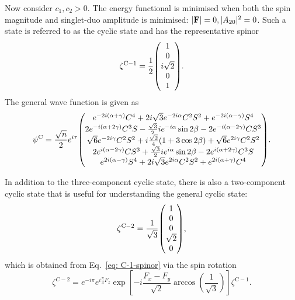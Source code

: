 Now consider \(c_1, c_2 > 0\).
The energy functional is minimised when both the spin magnitude and singlet-duo
amplitude is minimised: \(|\vb{F}| = 0, |A_{20}|^2=0\).
Such a state is referred to as the cyclic state and has the representative
spinor
\begin{equation}
    \zeta^\mathrm{C-1} = \frac{1}{2}\mqty(1 \\ 0 \\ i\sqrt{2} \\ 0 \\ 1).
    \label{eq: C-1-spinor}
\end{equation}
The general wave function is given as
\begin{equation}
    \psi^\mathrm{C} = \frac{\sqrt{n}}{2}e^{i\tau} \mqty(
    e^{-2i(\alpha+\gamma)}C^4 + 2i\sqrt{3}e^{-2i\alpha}C^2S^2
    + e^{-2i(\alpha-\gamma)}S^4
    \\
    2e^{-i(\alpha+2\gamma)}C^3S - \frac{\sqrt{3}}{2}ie^{-i\alpha}\sin 2\beta
    - 2e^{-i(\alpha-2\gamma)}CS^3
    \\
    \sqrt{6}e^{-2i\gamma}C^2S^2 + i\frac{\sqrt{2}}{4}(1+3\cos 2\beta)
    + \sqrt{6}e^{2i\gamma}C^2S^2
    \\
    2e^{i(\alpha-2\gamma)}CS^3 + \frac{\sqrt{3}}{2}ie^{i\alpha}\sin 2\beta
    - 2e^{i(\alpha+2\gamma)}C^3S
    \\
    e^{2i(\alpha-\gamma)}S^4 + 2i\sqrt{3}e^{2i\alpha}C^2S^2
    + e^{2i(\alpha+\gamma)}C^4
    ).
\end{equation}

In addition to the three-component cyclic state, there is also a two-component
cyclic state that is useful for understanding the general cyclic state:
\begin{equation}
    \zeta^\mathrm{C-2} = \frac{1}{\sqrt{3}}\mqty(1  \\ 0 \\ 0 \\ \sqrt{2} \\ 0),
    \label{eq: C-2-spinor}
\end{equation}
which is obtained from Eq.~\eqref{eq: C-1-spinor} via the spin rotation
\begin{equation}
    \zeta^{C-2} = e^{-i\pi}e^{i\frac{\pi}{4}F_z}
    \exp\left[-i\frac{F_x-F_y}{\sqrt{2}}
        \arccos{\left(\frac{1}{\sqrt{3}}\right)}\right]\zeta^\mathrm{C-1}.
\end{equation}

